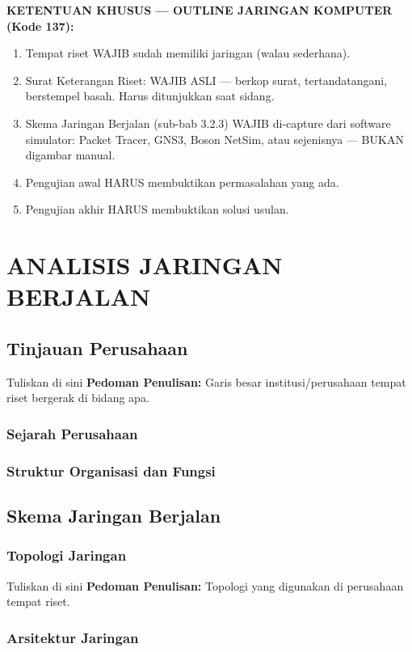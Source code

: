 \noindent\textbf{KETENTUAN KHUSUS — OUTLINE JARINGAN KOMPUTER (Kode 137):}
\begin{enumerate}
    \item Tempat riset WAJIB sudah memiliki jaringan (walau sederhana).
    \item Surat Keterangan Riset: WAJIB ASLI — berkop surat, tertandatangani, berstempel basah. Harus ditunjukkan saat sidang.
    \item Skema Jaringan Berjalan (sub-bab 3.2.3) WAJIB di-capture dari software simulator: Packet Tracer, GNS3, Boson NetSim, atau sejenisnya — BUKAN digambar manual.
    \item Pengujian awal HARUS membuktikan permasalahan yang ada.
    \item Pengujian akhir HARUS membuktikan solusi usulan.
\end{enumerate}

\vspace{0.5cm}


\chapter{ANALISIS JARINGAN BERJALAN}
\section{Tinjauan Perusahaan}


Tuliskan di sini \textbf{Pedoman Penulisan:} Garis besar institusi/perusahaan tempat riset bergerak di bidang apa.


\subsection{Sejarah Perusahaan}
\subsection{Struktur Organisasi dan Fungsi}
\section{Skema Jaringan Berjalan}
\subsection{Topologi Jaringan}


Tuliskan di sini \textbf{Pedoman Penulisan:} Topologi yang digunakan di perusahaan tempat riset.


\subsection{Arsitektur Jaringan}


